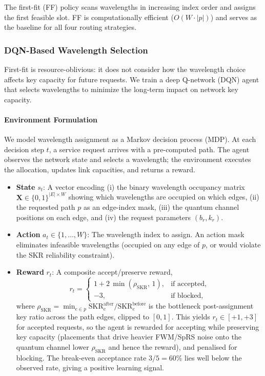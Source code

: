 \documentclass[conference]{IEEEtran}
\begin{document}
The first-fit (FF) policy scans wavelengths in increasing index order and assigns the first feasible slot. FF is computationally efficient ($O(W \cdot |p|)$) and serves as the baseline for all four routing strategies.

\subsubsection{DQN-Based Wavelength Selection}

First-fit is resource-oblivious: it does not consider how the wavelength choice affects key capacity for future requests. We train a deep Q-network (DQN) agent that selects wavelengths to minimize the long-term impact on network key capacity.

\paragraph{Environment Formulation}

We model wavelength assignment as a Markov decision process (MDP). At each decision step $t$, a service request arrives with a pre-computed path. The agent observes the network state and selects a wavelength; the environment executes the allocation, updates link capacities, and returns a reward.

\begin{itemize}
    \item \textbf{State} $s_t$: A vector encoding (i) the binary wavelength occupancy matrix $\mathbf{X} \in \{0,1\}^{|E| \times W}$ showing which wavelengths are occupied on which edges, (ii) the requested path $p$ as an edge-index mask, (iii) the quantum channel positions on each edge, and (iv) the request parameters $(b_r, k_r)$.
    \item \textbf{Action} $a_t \in \{1, \ldots, W\}$: The wavelength index to assign. An action mask eliminates infeasible wavelengths (occupied on any edge of $p$, or would violate the SKR reliability constraint).
    \item \textbf{Reward} $r_t$: A composite accept/preserve reward,
    \begin{equation}
    r_t = \begin{cases}
        1 + 2\,\min\!\left(\rho_{\text{SKR}},\, 1\right), & \text{if accepted},\\[2pt]
        -3, & \text{if blocked},
    \end{cases}
    \label{eq:reward}
    \end{equation}
    where $\rho_{\text{SKR}} = \min_{e \in p} \text{SKR}^{\text{after}}_e / \text{SKR}^{\text{before}}_e$ is the bottleneck post-assignment key ratio across the path edges, clipped to $[0,1]$. This yields $r_t \in [+1, +3]$ for accepted requests, so the agent is rewarded for accepting while preserving key capacity (placements that drive heavier FWM/SpRS noise onto the quantum channel lower $\rho_{\text{SKR}}$ and hence the reward), and penalised for blocking. The break-even acceptance rate $3/5 = 60\%$ lies well below the observed rate, giving a positive learning signal.
\end{itemize}
\end{document}
